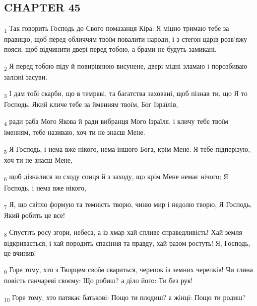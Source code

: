 \subsection{CHAPTER 45}
\begin{tcolorbox}
\textsubscript{1} Так говорить Господь до Свого помазанця Кіра: Я міцно тримаю тебе за правицю, щоб перед обличчям твоїм повалити народи, і з стегон царів розв'яжу пояси, щоб відчинити двері перед тобою, а брами не будуть замикані.
\end{tcolorbox}
\begin{tcolorbox}
\textsubscript{2} Я перед тобою піду й повирівнюю висунене, двері мідні зламаю і порозбиваю залізні засуви.
\end{tcolorbox}
\begin{tcolorbox}
\textsubscript{3} І дам тобі скарби, що в темряві, та багатства заховані, щоб пізнав ти, що Я то Господь, Який кличе тебе за йменням твоїм, Бог Ізраїлів,
\end{tcolorbox}
\begin{tcolorbox}
\textsubscript{4} ради раба Мого Якова й ради вибранця Мого Ізраїля, і кличу тебе твоїм іменням, тебе називаю, хоч ти не знаєш Мене.
\end{tcolorbox}
\begin{tcolorbox}
\textsubscript{5} Я Господь, і нема вже нікого, нема іншого Бога, крім Мене. Я тебе підперізую, хоч ти не знаєш Мене,
\end{tcolorbox}
\begin{tcolorbox}
\textsubscript{6} щоб дізналися зо сходу сонця й з заходу, що крім Мене немає нічого; Я Господь, і нема вже нікого,
\end{tcolorbox}
\begin{tcolorbox}
\textsubscript{7} Я, що світло формую та темність творю, чиню мир і недолю творю, Я Господь, Який робить це все!
\end{tcolorbox}
\begin{tcolorbox}
\textsubscript{8} Спустіть росу згори, небеса, а із хмар хай спливе справедливість! Хай земля відкривається, і хай породить спасіння та правду, хай разом ростуть! Я, Господь, це вчинив!
\end{tcolorbox}
\begin{tcolorbox}
\textsubscript{9} Горе тому, хто з Творцем своїм свариться, черепок із земних черепків! Чи глина повість ганчареві своєму: Що робиш? а діло його: Ти без рук!
\end{tcolorbox}
\begin{tcolorbox}
\textsubscript{10} Горе тому, хто патякає батькові: Пощо ти плодиш? а жінці: Пощо ти родиш?
\end{tcolorbox}
